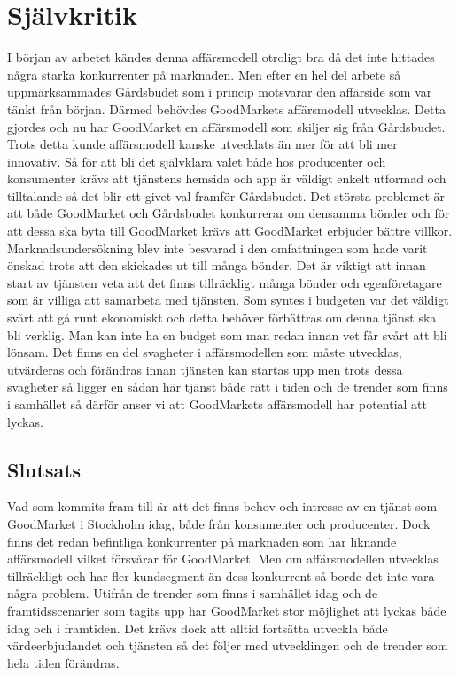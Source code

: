 \documentclass[10pt,a4paper,oneside]{article}
\begin{document}
\newpage

\section{Självkritik}
I början av arbetet kändes denna affärsmodell otroligt bra då det inte hittades några starka konkurrenter på marknaden. Men efter en hel del arbete så uppmärksammades Gårdsbudet som i princip motsvarar den affärside som var tänkt från början. Därmed behövdes GoodMarkets affärsmodell utvecklas. Detta gjordes och nu har GoodMarket en affärsmodell som skiljer sig från Gårdsbudet. Trots detta kunde affärsmodell kanske utvecklats än mer för att bli mer innovativ. Så för att bli det självklara valet både hos producenter och konsumenter krävs att tjänstens hemsida och app är väldigt enkelt utformad och tilltalande så det blir ett givet val framför Gårdsbudet. Det största problemet är att både GoodMarket och Gårdsbudet konkurrerar om densamma bönder och för att dessa ska byta till GoodMarket krävs att GoodMarket erbjuder bättre villkor. Marknadsundersökning blev inte besvarad i den omfattningen som hade varit önskad trots att den skickades ut till många bönder. Det är viktigt att innan start av tjänsten veta att det finns tillräckligt många bönder och egenföretagare som är villiga att samarbeta med tjänsten. Som syntes i budgeten var det väldigt svårt att gå runt ekonomiskt och detta behöver förbättras om denna tjänst ska bli verklig. Man kan inte ha en budget som man redan innan vet får svårt att bli lönsam. Det finns en del svagheter i affärsmodellen som måste utvecklas, utvärderas och förändras innan tjänsten kan startas upp men trots dessa svagheter så ligger en sådan här tjänst både rätt i tiden och de trender som finns i samhället så därför anser vi att GoodMarkets affärsmodell har potential att lyckas. 

\subsection{Slutsats}
Vad som kommits fram till är att det finns behov och intresse av en tjänst som GoodMarket i Stockholm idag, både från konsumenter och producenter. Dock finns det redan befintliga konkurrenter på marknaden som har liknande affärsmodell vilket försvårar för GoodMarket. Men om affärsmodellen utvecklas tillräckligt och har fler kundsegment än dess konkurrent så borde det inte vara några problem. Utifrån de trender som finns i samhället idag och de framtidsscenarier som tagits upp har GoodMarket stor möjlighet att lyckas både idag och i framtiden. Det krävs dock att alltid fortsätta utveckla både värdeerbjudandet och tjänsten så det följer med utvecklingen och de trender som hela tiden förändras. 
\newpage
\end{document}
